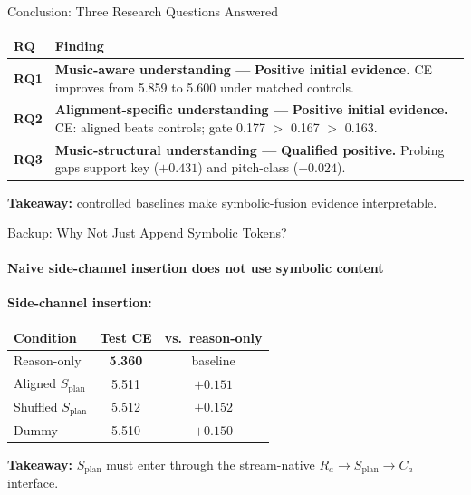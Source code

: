 \documentclass[aspectratio=169,11pt]{beamer}
\newcommand{\splan}{$S_{\mathrm{plan}}$}
\newcommand{\pos}[1]{{\bfseries\color{Green}#1}}
\newcommand{\bad}[1]{{\color{Red}#1}}
\renewcommand{\arraystretch}{1.18}
\begin{document}
\begin{frame}{Conclusion: Three Research Questions Answered}

  {\footnotesize\renewcommand{\arraystretch}{0.92}
  \begin{tabular}{p{1.2cm}p{11.0cm}}
    \toprule
    \textbf{RQ} & \textbf{Finding} \\
    \midrule
    \textbf{RQ1} &
      \textbf{Music-aware understanding — }\pos{Positive initial evidence.}\;
      CE improves from 5.859 to 5.600 under matched controls. \\[2pt]
    \textbf{RQ2} &
      \textbf{Alignment-specific understanding — }\pos{Positive initial evidence.}\;
      CE: aligned beats controls; gate 0.177 $>$ 0.167 $>$ 0.163. \\[2pt]
    \textbf{RQ3} &
      \textbf{Music-structural understanding — }\pos{Qualified positive.}\;
      Probing gaps support key ($+0.431$) and pitch-class ($+0.024$). \\
    \bottomrule
  \end{tabular}}

  \smallskip
  \begin{tcolorbox}[good]
    \textbf{Takeaway:} controlled baselines make symbolic-fusion evidence interpretable.
  \end{tcolorbox}
\end{frame}

\appendix

\begin{frame}{Backup: Why Not Just Append Symbolic Tokens?}
  \framesubtitle{Naive side-channel insertion does not use symbolic content}

  \textbf{Side-channel insertion:}

  {\small
  \begin{tabular}{p{4.5cm}cc}
    \toprule
    \textbf{Condition} & \textbf{Test CE} & \textbf{vs.\ reason-only} \\
    \midrule
    Reason-only          & \pos{5.360} & baseline \\
    Aligned \splan{}     & 5.511 & \bad{$+0.151$} \\
    Shuffled \splan{}    & 5.512 & \bad{$+0.152$} \\
    Dummy                & 5.510 & \bad{$+0.150$} \\
    \bottomrule
  \end{tabular}}

  \smallskip
  \begin{tcolorbox}[warn]
    \textbf{Takeaway:} \splan{} must enter through the stream-native
    $R_a \to S_{\mathrm{plan}} \to C_a$ interface.
  \end{tcolorbox}
\end{frame}
\end{document}
